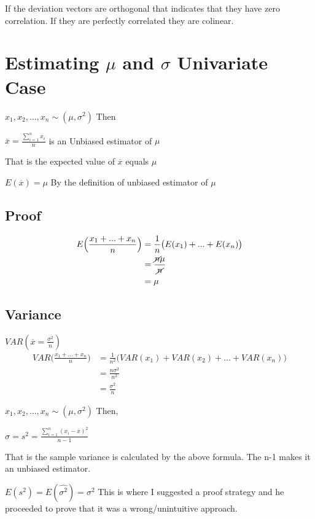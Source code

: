 If the deviation vectors are orthogonal that indicates that they have zero correlation. If they are perfectly correlated they are colinear. 

\section*{Estimating $\mu$ and $\sigma$ Univariate Case}
$x_1, x_2, ..., x_n \sim (\mu,\sigma^2)$ Then

$\overline{x} = \frac{\displaystyle\sum^n_{i=1} x_i}{n}$ is an Unbiased estimator of $\mu$

That is the expected value of $\overline{x}$ equals $\mu$

$E(\overline{x}) = \mu$ By the definition of unbiased estimator of $\mu$

\subsection*{Proof}
\begin{align*}
E\Big( \frac{x_1 + ... + x_n}{n} \Big) &= \frac{1}{n} \big( E(x_1)+...+E(x_n) \big) \\
&= \frac{\cancel{n}\mu}{\cancel{n}}\\
&= \mu
\end{align*}

\subsection{Variance}
$VAR(\overline{x} = \frac{\sigma^2}{n})$
\begin{align*}
    VAR\Big(\frac{x_1 + ... + x_n}{n}) &=\frac{1}{n^2}\Big( VAR(x_1) + VAR(x_2) + ... +VAR(x_n) \Big) \\
    &= \frac{n \sigma^2}{n^2} \\
    &= \frac{ \sigma^2}{n}
\end{align*}

$x_1, x_2,..., x_n \sim(\mu,\sigma^2)$ Then,

$\hat{\sigma} = s^2 = \frac{\displaystyle\sum_{i=1}^{n}(x_i-\overline{x})^2}{n-1}$

That is the sample variance is calculated by the above formula. The n-1 makes it an unbiased estimator.

$E(s^2) = E(\hat{\sigma^2}) = \sigma^2$
This is where I suggested a proof strategy and he proceeded to prove that it was a wrong/unintuitive approach.

